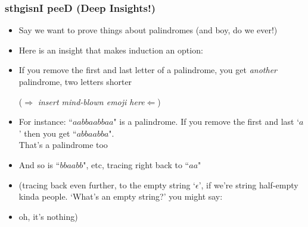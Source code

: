  \begin{frame}
\frametitle{sthgisnI peeD (Deep Insights!)}

\begin{itemize}[<+->]
\item Say we want to prove things about palindromes \footnotesize{(and boy, do we ever!)}

\item Here is an insight that makes induction an option:

\item If you remove the first and last letter of a palindrome, you get {\it{another}} palindrome, two letters shorter \\ \centerline{($\Rightarrow$ \textit{insert mind-blown emoji here}$\Leftarrow$)} 

\item For instance: ``$aabbaabbaa$" is a palindrome. If you remove the first and last `$a$' then you get  ``$abbaabba$". \\ That's a palindrome too 

\item  And so is ``$bbaabb$", etc, tracing right back to ``$aa$" 

\item[] \small{(tracing back even further, to the empty string `$\epsilon$', if we're string half-empty kinda people. `What's an empty string?' you might say:} \\ 

\item[] \small{oh, it's nothing)} 

\end{itemize} 
\end{frame}

